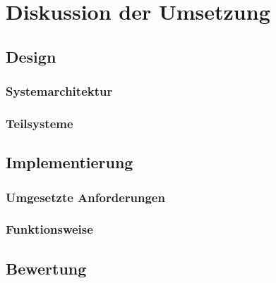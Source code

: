 \chapter{Diskussion der Umsetzung}
\section{Design}
    \subsection{Systemarchitektur}
    \subsection{Teilsysteme}

\section{Implementierung}
    \subsection{Umgesetzte Anforderungen}
    \subsection{Funktionsweise}

\section{Bewertung}